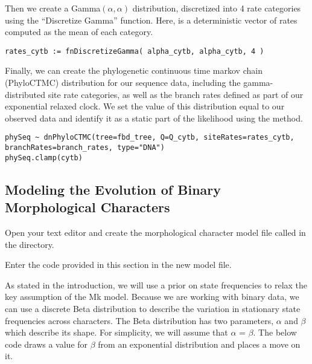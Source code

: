 Then we create a Gamma$(\alpha,\alpha)$ distribution, discretized into 4 rate categories using the ``Discretize Gamma'' function.
Here,  is a deterministic vector of rates computed as the mean of each category.
{\tt \begin{snugshade*}
\begin{lstlisting}
rates_cytb := fnDiscretizeGamma( alpha_cytb, alpha_cytb, 4 )
\end{lstlisting}
\end{snugshade*}}

Finally, we can create the phylogenetic continuous time markov chain (PhyloCTMC) distribution for our sequence data, including the gamma-distributed site rate categories, as well as the branch rates defined as part of our exponential relaxed clock.
We set the value of this distribution equal to our observed data and identify it as a static part of the likelihood using the  method.
{\tt \begin{snugshade*}
\begin{lstlisting}
phySeq ~ dnPhyloCTMC(tree=fbd_tree, Q=Q_cytb, siteRates=rates_cytb, branchRates=branch_rates, type="DNA")
phySeq.clamp(cytb)
\end{lstlisting}
\end{snugshade*}}

\bigskip

\subsection{Modeling the Evolution of Binary Morphological Characters}\label{subsect:RB-ModelMorph}

{\begin{framed}
Open your text editor and create the morphological character model file called {\textcolor{red}{}} in the  directory.

Enter the \Rev code provided in this section in the new model file.
\end{framed}}

As stated in the introduction, we will use a prior on state frequencies to relax the key assumption of the Mk model. 
Because we are working with binary data, we can use a discrete Beta distribution to describe the variation in stationary state frequencies across characters. 
The Beta distribution has two parameters, $\alpha$ and $\beta$ which describe its shape. 
For simplicity, we will assume that $\alpha$ = $\beta$. 
The below code draws a value for $\beta$ from an exponential distribution and places a move on it.


